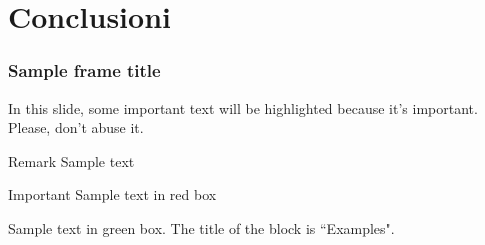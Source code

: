\documentclass{beamer}
\begin{document}

\section{Conclusioni}

\begin{frame}
\frametitle{Sample frame title}

In this slide, some important text will be
\alert{highlighted} because it's important.
Please, don't abuse it.

\begin{block}{Remark}
Sample text
\end{block}

\begin{alertblock}{Important }
Sample text in red box
\end{alertblock}

\begin{examples}
Sample text in green box. The title of the block is ``Examples".
\end{examples}
\end{frame}
\end{document}
